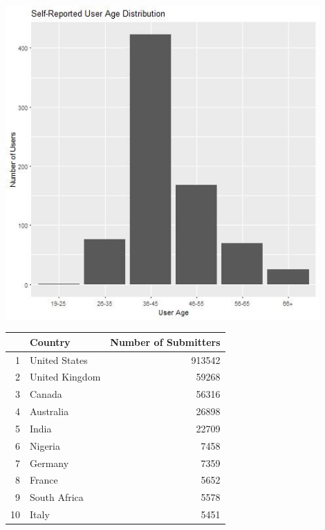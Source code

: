 \documentclass[]{report}   %
\begin{document}
\begin{minipage}{0.45\textwidth}
\centering
\includegraphics[width=0.9\textwidth]{userAge_plot.jpg}
\label{fig:userAge}
\end{minipage}
\hfill
\begin{minipage}{0.45\textwidth}
     \centering
{}
\label{table:userCountry}
\begin{tabular}{rlr}
  \hline
 & Country & Number of Submitters \\ 
  \hline
1 & United States & 913542 \\ 
  2 & United Kingdom & 59268 \\ 
  3 & Canada & 56316 \\ 
  4 & Australia & 26898 \\ 
  5 & India & 22709 \\ 
  6 & Nigeria & 7458 \\ 
  7 & Germany & 7359 \\ 
  8 & France & 5652 \\ 
  9 & South Africa & 5578 \\ 
  10 & Italy & 5451 \\ 
   \hline
\end{tabular}
    \end{minipage}
\FloatBarrier
\end{document}
